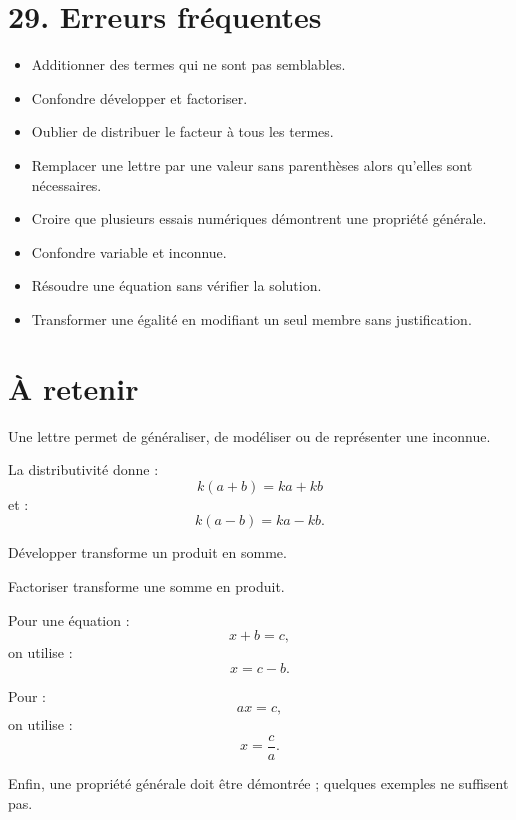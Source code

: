 \section{29. Erreurs fréquentes}

\begin{itemize}
\item Additionner des termes qui ne sont pas semblables.
\item Confondre développer et factoriser.
\item Oublier de distribuer le facteur à tous les termes.
\item Remplacer une lettre par une valeur sans parenthèses alors qu'elles sont nécessaires.
\item Croire que plusieurs essais numériques démontrent une propriété générale.
\item Confondre variable et inconnue.
\item Résoudre une équation sans vérifier la solution.
\item Transformer une égalité en modifiant un seul membre sans justification.
\end{itemize}

\section{À retenir}

\begin{aretenir}
Une lettre permet de généraliser, de modéliser ou de représenter une inconnue.

La distributivité donne :
\[
\boxed{k(a+b)=ka+kb}
\]
et :
\[
\boxed{k(a-b)=ka-kb}.
\]

Développer transforme un produit en somme.

Factoriser transforme une somme en produit.

Pour une équation :
\[
x+b=c,
\]
on utilise :
\[
\boxed{x=c-b}.
\]

Pour :
\[
ax=c,
\]
on utilise :
\[
\boxed{x=\dfrac ca}.
\]

Enfin, une propriété générale doit être démontrée ; quelques exemples ne suffisent pas.
\end{aretenir}
